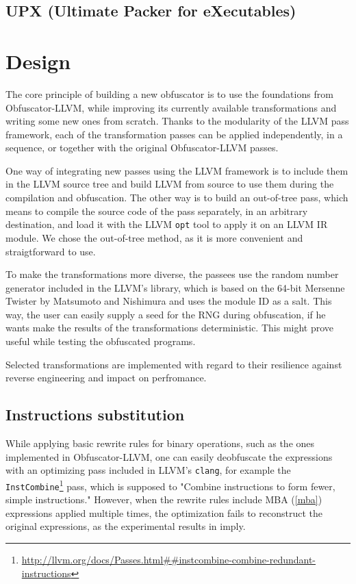 \documentclass[
  digital, %
  table,   %
  twoside, %
  nolof,     %
  nolot,     %
]{fithesis3}
\theoremstyle{definition}
\begin{document}
\section{UPX (Ultimate Packer for eXecutables)}

\chapter{Design}

The core principle of building a new obfuscator is to use the foundations from Obfuscator-LLVM, while improving its currently available transformations and writing some new ones from scratch. Thanks to the modularity of the LLVM pass framework, each of the transformation passes can be applied independently, in a sequence, or together with the original Obfuscator-LLVM passes. 

One way of integrating new passes using the LLVM framework is to include them in the LLVM source tree and build LLVM from source to use them during the compilation and obfuscation. The other way is to build an out-of-tree pass, which means to compile the source code of the pass separately, in an arbitrary destination, and load it with the LLVM \texttt{opt} tool to apply it on an LLVM IR module. We chose the out-of-tree method, as it is more convenient and straigtforward to use. 

To make the transformations more diverse, the passees use the random number generator included in the LLVM's library, which is based on the 64-bit Mersenne Twister by Matsumoto and Nishimura and uses the module ID as a salt. This way, the user can easily supply a seed for the RNG during obfuscation, if he wants make the results of the transformations deterministic. This might prove useful while testing the obfuscated programs. 

Selected transformations are implemented with regard to their resilience against reverse engineering and impact on perfromance.

\section{Instructions substitution}
While applying basic rewrite rules for binary operations, such as the ones implemented in Obfuscator-LLVM, one can easily deobfuscate the expressions with an optimizing pass included in LLVM's \texttt{clang}, for example the \texttt{InstCombine}\footnote{\url{http://llvm.org/docs/Passes.html##instcombine-combine-redundant-instructions}} pass, which is supposed to "Combine instructions to form fewer, simple instructions." However, when the rewrite rules include MBA (\ref{mba}) expressions applied multiple times, the optimization fails to reconstruct the original expressions, as the experimental results in \cite{eyrollesMBAobf} imply. 
\end{document}
